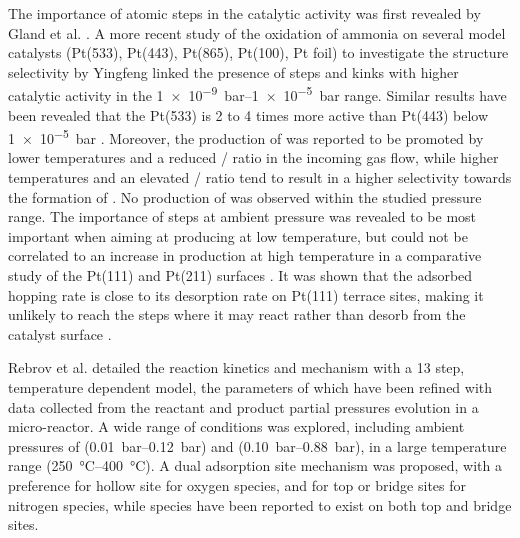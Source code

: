 The importance of atomic steps in the catalytic activity was first revealed by Gland et al. \parencite*{Gland1978, Gland1980}.
A more recent study of the oxidation of ammonia on several model catalysts (Pt(533), Pt(443), Pt(865), Pt(100), Pt foil) to investigate the structure selectivity by Yingfeng \parencite*{Yingfeng2008} linked the presence of steps and kinks with higher catalytic activity in the \qtyrange{1e-9}{1e-5}{\bar} range.
Similar results have been revealed that the Pt(533) is 2 to 4 times more active than Pt(443) below \qty{1e-5}{\bar} \parencite{Scheibe2005}.
Moreover, the production of  was reported to be promoted by lower temperatures and a reduced / ratio in the incoming gas flow, while higher temperatures and an elevated / ratio tend to result in a higher selectivity towards the formation of  \parencite{Zeng2009}.
No production of  was observed within the studied pressure range.
The importance of steps at ambient pressure was revealed to be most important when aiming at producing  at low temperature, but could not be correlated to an increase in  production at high temperature in a comparative study of the Pt(111) and Pt(211) surfaces \parencite{Ma2019}.
It was shown that the adsorbed  hopping rate is close to its desorption rate on Pt(111) terrace sites, making it unlikely to reach the steps where it may react rather than desorb from the catalyst surface \parencite{Borodin2021}.

Rebrov et al. \parencite*{Rebrov2002} detailed the reaction kinetics and mechanism with a 13 step, temperature dependent model, the parameters of which have been refined with data collected from the reactant and product partial pressures evolution in a micro-reactor.
A wide range of conditions was explored, including ambient pressures of  (\qtyrange{0.01}{0.12}{\bar}) and  (\qtyrange{0.10}{0.88}{\bar}), in a large temperature range (\qtyrange{250}{400}{\degreeCelsius}).
A dual adsorption site mechanism was proposed, with a preference for hollow site for oxygen species, and for top or bridge sites for nitrogen species, while  species have been reported to exist on both top and bridge sites.

